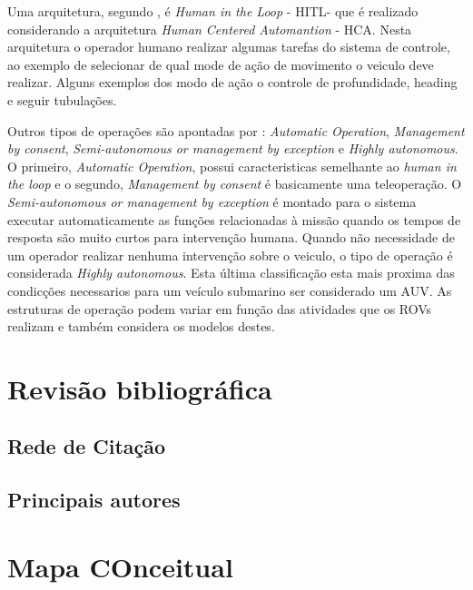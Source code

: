 Uma arquitetura, segundo \cite{wireless_joy}, é \textit{Human in the Loop} - HITL- que é realizado considerando a arquitetura \textit{Human Centered Automantion} - HCA. Nesta arquitetura o operador humano realizar algumas tarefas do sistema de controle, ao exemplo de selecionar de qual mode de ação de movimento o veiculo deve realizar. Alguns exemplos dos modo de ação o controle de profundidade, heading e seguir tubulações.

Outros tipos de operações são apontadas por \cite{Towards}: \textit{Automatic Operation}, \textit{Management by consent}, \textit{Semi-autonomous or management by exception} e \textit{Highly autonomous}. O primeiro, \textit{Automatic Operation}, possui caracteristicas semelhante ao \textit{human in the loop} e o segundo, \textit{Management by consent} é basicamente uma teleoperação. O \textit{Semi-autonomous or management by exception} é montado para o sistema executar automaticamente as funções relacionadas à missão quando os tempos de resposta são muito curtos para intervenção humana.  Quando não necessidade de um operador realizar nenhuma intervenção sobre o veiculo, o tipo de operação é considerada \textit{Highly autonomous}. Esta última classificação esta mais proxima das condicções necessarios para um veículo submarino ser considerado um AUV. As estruturas de operação podem variar em função das atividades que os ROVs realizam e também considera os modelos destes. 










\section{Revisão bibliográfica}
\subsection{Rede de Citação}
\subsection{Principais autores}


\section{Mapa COnceitual}
\lipsum[1]







